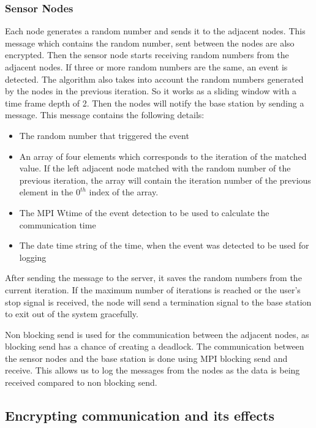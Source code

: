 \documentclass[conference]{IEEEtran}
\begin{document}
	\subsubsection{Sensor Nodes}
	
	Each node generates a random number and sends it to the adjacent nodes. This message which contains the random number, sent between the nodes are also encrypted. Then the sensor node starts receiving random numbers from the adjacent nodes. If three or more random numbers are the same, an event is detected. The algorithm also takes into account the random numbers generated by the nodes in the previous iteration. So it works as a sliding window with a time frame depth of 2. Then the nodes will notify the base station by sending a message. This message contains the following details:
	
		\begin{itemize}
		\item The random number that triggered the event
		\item An array of four elements which corresponds to the iteration of the matched value. If the left adjacent node matched with the random number of the previous iteration, the array will contain the iteration number of the previous element in the $0^{th}$ index of the array. 
		\item The MPI Wtime of the event detection to be used to calculate the communication time
		\item The date time string of the time, when the event was detected to be used for logging
	\end{itemize}
	
	After sending the message to the server, it saves the random numbers from the current iteration. If the maximum number of iterations is reached or the user's stop signal is received, the node will send a termination signal to the base station to exit out of the system gracefully.
	
	Non blocking send is used for the communication between the adjacent nodes, as blocking send has a chance of creating a deadlock. The communication between the sensor nodes and the base station is done using MPI blocking send and receive. This allows us to log the messages from the nodes as the data is being received compared to non blocking send.
	
	
	\subsection{ Encrypting communication and its effects }\label{encryption}
	
\end{document}
